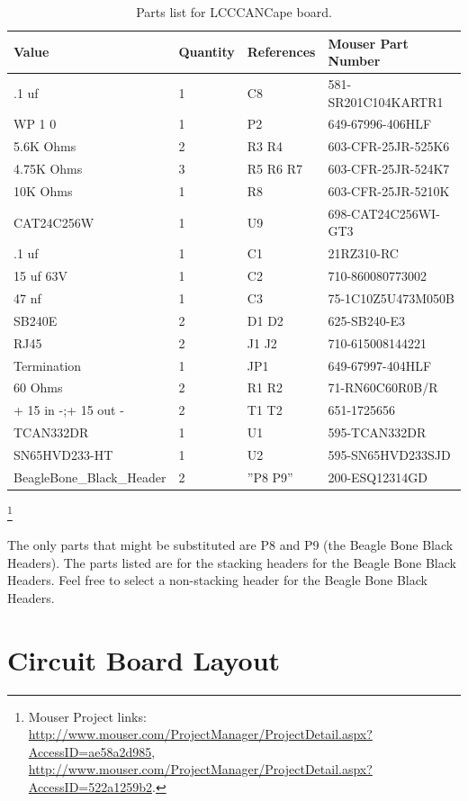 \begin{table}[htdp]
\begin{centering}\begin{tabular}{|l|l|p{1in}|l|}
\hline
Value&Quantity&References&Mouser Part Number \\
\hline
.1 uf&1&C8&581-SR201C104KARTR1 \\
\hline
WP 1 0&1&P2&649-67996-406HLF \\
\hline
5.6K Ohms&2&R3 R4&603-CFR-25JR-525K6 \\
\hline
4.75K Ohms&3&R5 R6 R7&603-CFR-25JR-524K7 \\
\hline
10K Ohms&1&R8&603-CFR-25JR-5210K \\
\hline
CAT24C256W&1&U9&698-CAT24C256WI-GT3 \\
\hline
.1 uf&1&C1&21RZ310-RC \\
\hline
15 uf 63V&1&C2&710-860080773002 \\
\hline
47 nf&1&C3&75-1C10Z5U473M050B \\
\hline
SB240E&2&D1 D2&625-SB240-E3 \\
\hline
RJ45&2&J1 J2&710-615008144221 \\
\hline
Termination&1&JP1&649-67997-404HLF \\
\hline
60 Ohms&2&R1 R2&71-RN60C60R0B/R \\
\hline
+ 15 in -;+ 15 out -&2&T1 T2&651-1725656 \\
\hline
TCAN332DR&1&U1&595-TCAN332DR \\
\hline
SN65HVD233-HT&1&U2&595-SN65HVD233SJD \\
\hline
BeagleBone\_Black\_Header&2&''P8 P9''&200-ESQ12314GD \\
\hline
\end{tabular}
\caption{Parts list for LCCCANCape board.}
\end{centering}\end{table}\footnote{Mouser Project links: 
\url{http://www.mouser.com/ProjectManager/ProjectDetail.aspx?AccessID=ae58a2d985},
\url{http://www.mouser.com/ProjectManager/ProjectDetail.aspx?AccessID=522a1259b2}.}


The only parts that might be substituted are P8 and P9 (the Beagle Bone Black
Headers). The parts listed are for the stacking headers for the Beagle Bone
Black Headers. Feel free to select a non-stacking header for the Beagle Bone
Black Headers.


\section{Circuit Board Layout}

